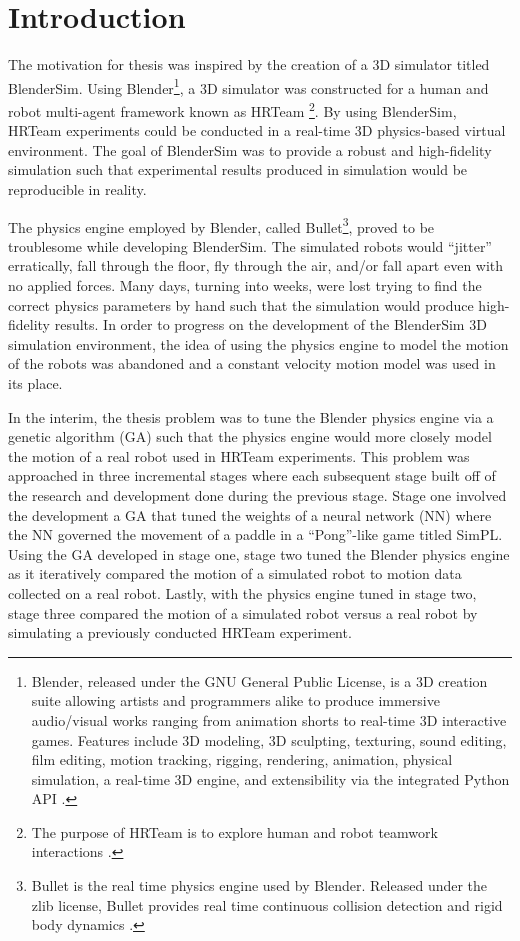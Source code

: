 \chapter{Introduction}

\label{Chapter1}


The motivation for thesis was inspired by the creation of a 3D simulator titled BlenderSim. Using Blender\footnote{Blender, released under the GNU General Public License, is a 3D creation suite allowing artists and programmers alike to produce immersive audio/visual works ranging from animation shorts to real-time 3D interactive games. Features include 3D modeling, 3D sculpting, texturing, sound editing, film editing, motion tracking, rigging, rendering, animation, physical simulation, a real-time 3D engine, and extensibility via the integrated Python API \cite{Hess:2007:EBG:1543288}.}, a 3D simulator was constructed for a human and robot multi-agent framework known as HRTeam \footnote{The purpose of HRTeam is to explore human and robot teamwork interactions \cite{hrteam}\cite{sklar-et-al-arms:2011}.}. By using BlenderSim, HRTeam experiments could be conducted in a real-time 3D physics-based virtual environment. The goal of BlenderSim was to provide a robust and high-fidelity simulation such that experimental results produced in simulation would be reproducible in reality.  

The physics engine employed by Blender, called Bullet\footnote{Bullet is the real time physics engine used by Blender. Released under the zlib license, Bullet provides real time continuous collision detection and rigid body dynamics \cite{website:continuousphysics}.}, proved to be troublesome while developing BlenderSim. The simulated robots would ``jitter'' erratically, fall through the floor, fly through the air, and/or fall apart even with no applied forces. Many days, turning into weeks, were lost trying to find the correct physics parameters by hand such that the simulation would produce high-fidelity results. In order to progress on the development of the BlenderSim 3D simulation environment, the idea of using the physics engine to model the motion of the robots was abandoned and a constant velocity motion model was used in its place. 

In the interim, the thesis problem was to tune the Blender physics engine via a genetic algorithm (GA) such that the physics engine would more closely model the motion of a real robot used in HRTeam experiments. This problem was approached in three incremental stages where each subsequent stage built off of the research and development done during the previous stage. Stage one involved the development a GA that tuned the weights of a neural network (NN) where the NN governed the movement of a paddle in a ``Pong''-like game titled SimPL. Using the GA developed in stage one, stage two tuned the Blender physics engine as it iteratively compared the motion of a simulated robot to motion data collected on a real robot. Lastly, with the physics engine tuned in stage two, stage three compared the motion of a simulated robot versus a real robot by simulating a previously conducted HRTeam experiment.           

